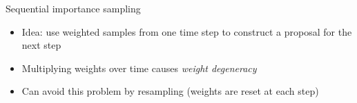 \documentclass[aspectratio=169]{beamer}
\theoremstyle{definition}
\begin{document}
\begin{frame}{Sequential importance sampling}
\begin{itemize}
\item Idea: use weighted samples from one time step to construct a proposal for the next step
\item Multiplying weights over time causes \textit{weight degeneracy}%
\item Can avoid this problem by resampling (weights are reset at each step)

\end{itemize}

\end{frame}
\end{document}
